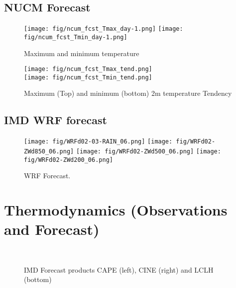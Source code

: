 \documentclass[10pt,a4paper]{article} %
\begin{document}
\subsection{NUCM Forecast}
\begin{figure}[H]
\centering
\texttt{[image: fig/ncum\_fcst\_Tmax\_day-1.png]}
\texttt{[image: fig/ncum\_fcst\_Tmin\_day-1.png]}
\caption{Maximum and minimum temperature}
\end{figure}


\begin{figure}[H]
\centering
\texttt{[image: fig/ncum\_fcst\_Tmax\_tend.png]}\\
\vskip 0.5cm
\texttt{[image: fig/ncum\_fcst\_Tmin\_tend.png]}
\caption{Maximum (Top) and minimum (bottom) 2m temperature Tendency}
\end{figure}



\subsection{IMD WRF forecast}

\begin{figure}[H]
\centering
\texttt{[image: fig/WRFd02-03-RAIN\_06.png]}
\texttt{[image: fig/WRFd02-ZWd850\_06.png]}
\texttt{[image: fig/WRFd02-ZWd500\_06.png]}
\texttt{[image: fig/WRFd02-ZWd200\_06.png]}
\caption{WRF Forecast.}
\end{figure}







\section{Thermodynamics (Observations and Forecast) }
\begin{figure}[H]
\centering
{} \hskip 0.1cm
%
\\
\vskip 0.1cm
\caption{IMD Forecast products CAPE (left), CINE (right) and  LCLH (bottom)}
\end{figure}
\end{document}
